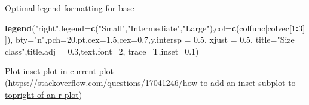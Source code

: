 \documentclass[10,portrait]{article}
\newenvironment{Shaded}{\begin{snugshade}}{\end{snugshade}}
\newcommand{\KeywordTok}[1]{\textcolor[rgb]{0.13,0.29,0.53}{\textbf{#1}}}
\newcommand{\DataTypeTok}[1]{\textcolor[rgb]{0.13,0.29,0.53}{#1}}
\newcommand{\DecValTok}[1]{\textcolor[rgb]{0.00,0.00,0.81}{#1}}
\newcommand{\FloatTok}[1]{\textcolor[rgb]{0.00,0.00,0.81}{#1}}
\newcommand{\StringTok}[1]{\textcolor[rgb]{0.31,0.60,0.02}{#1}}
\newcommand{\OperatorTok}[1]{\textcolor[rgb]{0.81,0.36,0.00}{\textbf{#1}}}
\newcommand{\NormalTok}[1]{#1}
\begin{document}
Optimal legend formatting for base

\begin{Shaded}
\begin{Highlighting}[]
\KeywordTok{legend}\NormalTok{(}\StringTok{"right"}\NormalTok{,}\DataTypeTok{legend=}\KeywordTok{c}\NormalTok{(}\StringTok{"Small"}\NormalTok{,}\StringTok{"Intermediate"}\NormalTok{,}\StringTok{"Large"}\NormalTok{),}\DataTypeTok{col=}\KeywordTok{c}\NormalTok{(colfunc[colvec[}\DecValTok{1}\OperatorTok{:}\DecValTok{3}\NormalTok{]]),}
       \DataTypeTok{bty=}\StringTok{"n"}\NormalTok{,}\DataTypeTok{pch=}\DecValTok{20}\NormalTok{,}\DataTypeTok{pt.cex=}\FloatTok{1.5}\NormalTok{,}\DataTypeTok{cex=}\FloatTok{0.7}\NormalTok{,}\DataTypeTok{y.intersp =} \FloatTok{0.5}\NormalTok{, }\DataTypeTok{xjust =} \FloatTok{0.5}\NormalTok{,}
       \DataTypeTok{title=}\StringTok{"Size class"}\NormalTok{,}\DataTypeTok{title.adj =} \FloatTok{0.3}\NormalTok{,}\DataTypeTok{text.font=}\DecValTok{2}\NormalTok{,}
       \DataTypeTok{trace=}\NormalTok{T,}\DataTypeTok{inset=}\FloatTok{0.1}\NormalTok{)}
\end{Highlighting}
\end{Shaded}

Plot inset plot in current plot
(\url{https://stackoverflow.com/questions/17041246/how-to-add-an-inset-subplot-to-topright-of-an-r-plot})
\end{document}
